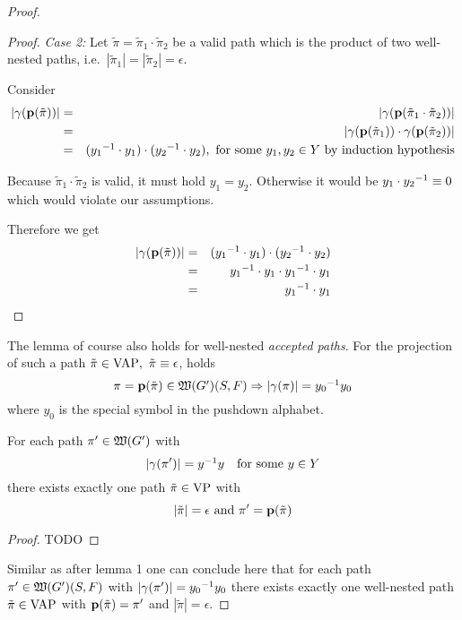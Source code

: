 \begin{proof}
\begin{proof}
\medskip
{\em Case 2:} Let $\tilde{\pi} = \tilde{\pi}_1 \cdot \tilde{\pi}_2$ be a valid
path which is the product of two well-nested paths, i.e.\ $|\tilde{\pi}_1| =
|\tilde{\pi}_2| = \epsilon$.

Consider
\begin{eqnarray*}
|\gamma(\mathbf{p}({\tilde{\pi}}))| &=& |\gamma(\mathbf{p}({\tilde{\pi}_1 \cdot
\tilde{\pi}_2}))| \\
&=& |\gamma(\mathbf{p}({\tilde{\pi}_1})) \cdot \gamma(\mathbf{p}({\tilde{\pi}_2}))| \\
&=& (\mbox{${y_1}^{-1}$} \cdot y_1) \cdot (\mbox{${y_2}^{-1}$} \cdot y_2),\text{ for some }y_1, y_2
\in Y\text{ by induction hypothesis}
\end{eqnarray*}

Because $\tilde{\pi}_1 \cdot \tilde{\pi}_2$ is valid, it must hold $y_1 = y_2$.
Otherwise it would be $y_1 \cdot \mbox{${y_2}^{-1}$} \equiv 0$ which would violate our 
assumptions.

Therefore we get
\begin{eqnarray*}
|\gamma(\mathbf{p}({\tilde{\pi}}))| &=& (\mbox{${y_1}^{-1}$} \cdot y_1) \cdot (\mbox{${y_2}^{-1}$} \cdot
y_2)\\
&=& \mbox{${y_1}^{-1}$} \cdot y_1 \cdot \mbox{${y_1}^{-1}$} \cdot y_1 \\
&=& \mbox{${y_1}^{-1}$} \cdot y_1
\end{eqnarray*}
\end{proof}

The lemma of course also holds for well-nested {\em accepted paths}. For the
projection of such a path $\tilde\pi \in \mathrm{VAP},\ \tilde\pi \equiv
\epsilon$,  holds 
\[ \pi = \mathbf{p}({\tilde{\pi}}) \in \mbox{$\mathfrak{W}({G'})$}(S, F) \Rightarrow |\gamma(\pi)| =
\mbox{${y_0}^{-1}$} y_0 \]
where $y_0$ is the special symbol in the pushdown alphabet.

\bigskip
\begin{lemma}
For each path $\pi' \in \mbox{$\mathfrak{W}({G'})$}$ with
\[ |\gamma(\pi')| = \mbox{${y}^{-1}$} y \quad\text{for some }y \in Y \]
there exists exactly one path $\tilde{\pi} \in \mathrm{VP}$ with 
\[ |\tilde{\pi}| = \epsilon\text{ and }\pi' = \mathbf{p}({\tilde{\pi}}) \] 
\end{lemma}

\begin{proof}
TODO
\end{proof}

Similar as after lemma 1 one can conclude here that for each path $\pi' \in
\mbox{$\mathfrak{W}({G'})$}(S, F)$ with $|\gamma(\pi')| = \mbox{${y_0}^{-1}$} y_0$ there exists exactly
one well-nested path $\tilde{\pi} \in \mathrm{VAP}$ with $\mathbf{p}({\tilde{\pi}}) =
\pi'$ and $|\tilde{\pi}| = \epsilon$.


\end{proof}
